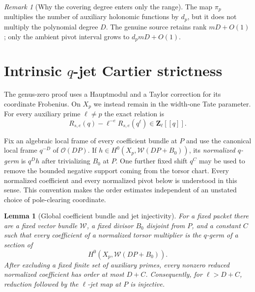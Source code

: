 \documentclass[11pt]{article}
\newtheorem{lemma}[lemma]{Lemma}
\theoremstyle{definition}
\theoremstyle{remark}
\newtheorem{remark}[remark]{Remark}
\newcommand{\Z}{\mathbf Z}
\newcommand{\calW}{\mathcal W}
\newcommand{\calO}{\mathcal O}
\begin{document}
\begin{remark}[Why the covering degree enters only the range]
The map $\pi_p$ multiplies the number of auxiliary holonomic functions by
$d_p$, but it does not multiply the polynomial degree $D$.  The genuine
source retains rank $mD+O(1)$; only the ambient pivot interval grows to
$d_pmD+O(1)$.
\end{remark}

\section{Intrinsic \texorpdfstring{$q$}{q}-jet Cartier strictness}
\label{sec:qjet}

The genus-zero proof uses a Hauptmodul and a Taylor correction for its
coordinate Frobenius.  On $X_p$ we instead remain in the width-one Tate
parameter.  For every auxiliary prime $\ell\ne p$ the exact relation is
\begin{equation}\label{eq:q-Dwork-all}
 R_{s,e}(q)-\ell^{-e}R_{s,e}(q^\ell)\in\Z_\ell[[q]].
\end{equation}

Fix an algebraic local frame of every coefficient bundle at $P$ and use the
canonical local frame $q^{-D}$ of $\calO(DP)$.  If
$h\in H^0(X_p,\calW(DP+B_0))$, its \emph{normalized $q$-germ} is
$q^Dh$ after trivializing $B_0$ at $P$.  One further fixed shift $q^C$ may be
used to remove the bounded negative support coming from the torsor chart.
Every normalized coefficient and every normalized pivot below is understood
in this sense.  This convention makes the order estimates independent of an
unstated choice of pole-clearing coordinate.

\begin{lemma}[Global coefficient bundle and jet injectivity]
\label{lem:q-jet-injective}
For a fixed packet there are a fixed vector bundle $\calW$, a fixed divisor
$B_0$ disjoint from $P$, and a constant $C$ such that every coefficient of a
normalized torsor multiplier is the $q$-germ of a section of
\[
 H^0(X_p,\calW(DP+B_0)).
\]
After excluding a fixed finite set of auxiliary primes, every nonzero reduced
normalized coefficient has order at most $D+C$.  Consequently, for
$\ell>D+C$, reduction followed by the $\ell$-jet map at $P$ is injective.
\end{lemma}
\end{document}
